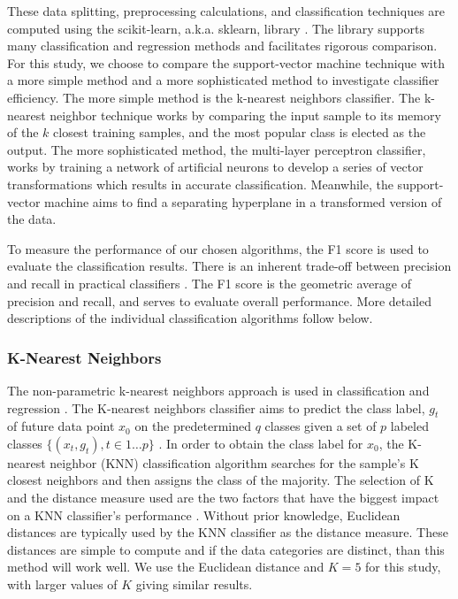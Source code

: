 These data splitting, preprocessing calculations, and classification techniques are 
computed using the scikit-learn, a.k.a. sklearn, library \cite{JMLR:v12:pedregosa11a}.
The library supports many classification and regression methods and facilitates rigorous comparison.
For this study, we choose to compare the support-vector machine technique with a more simple method
and a more sophisticated method to investigate classifier efficiency. 
The more simple method is the k-nearest neighbors classifier.
The k-nearest neighbor technique works by comparing the input sample to its memory of the $k$ closest training samples, 
 and the most popular class is elected as the output.
The more sophisticated method, the multi-layer perceptron classifier, works by training a 
 network of artificial neurons to develop a series of vector transformations which results
 in accurate classification. Meanwhile, the support-vector machine aims to find a separating
 hyperplane in a transformed version of the data. 

To measure the performance of our chosen algorithms, the F1 score is 
used to evaluate the classification results. 
There is an inherent trade-off between precision and recall in practical classifiers \cite{buckland94}.
The F1 score is the geometric average of
precision and recall, and serves to evaluate overall performance. 
More detailed descriptions of the individual classification algorithms follow below.

\subsubsection{K-Nearest Neighbors}

The non-parametric k-nearest neighbors approach is used in classification 
and regression \cite{Vaishnnave12019}.
The K-nearest neighbors classifier aims to predict the class label, $g_t$ of 
future data point $x_0$ on the predetermined $q$ classes given a set 
of $p$ labeled classes $\{(x_t, g_t), t \in 1 \ldots p\}$ \cite{Song2007}. 
In order to obtain the class label for $x_0$, the K-nearest neighbor (KNN)
 classification algorithm searches for the sample's K closest neighbors 
 and then assigns the class of the majority.
The selection of K and the distance measure used are the two factors 
that have the biggest impact on a KNN classifier's performance \cite{Alf2019}. 
Without prior knowledge, Euclidean distances are typically used by the KNN classifier 
as the distance measure. These distances are simple to compute and if the data
categories are distinct, than this method will work well.
We use the Euclidean distance and $K=5$ for this study, with larger values of $K$ giving similar results.

